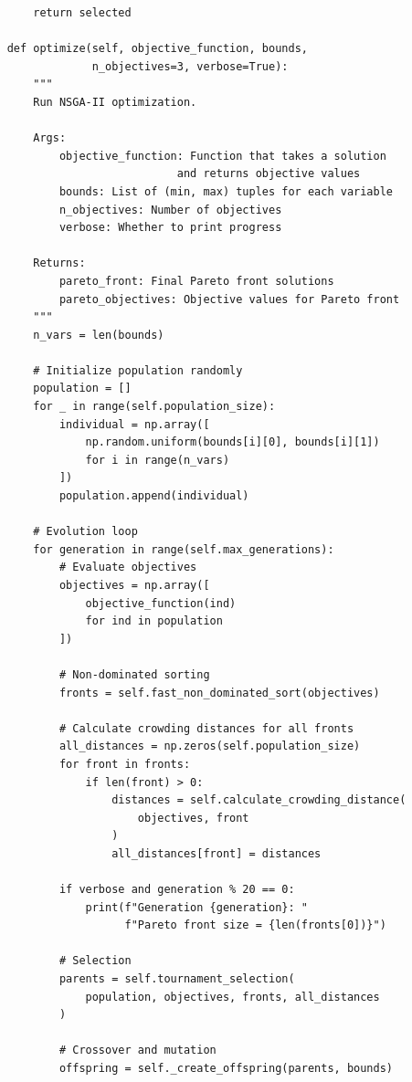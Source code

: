 \begin{lstlisting}
        return selected
    
    def optimize(self, objective_function, bounds, 
                 n_objectives=3, verbose=True):
        """
        Run NSGA-II optimization.
        
        Args:
            objective_function: Function that takes a solution
                              and returns objective values
            bounds: List of (min, max) tuples for each variable
            n_objectives: Number of objectives
            verbose: Whether to print progress
            
        Returns:
            pareto_front: Final Pareto front solutions
            pareto_objectives: Objective values for Pareto front
        """
        n_vars = len(bounds)
        
        # Initialize population randomly
        population = []
        for _ in range(self.population_size):
            individual = np.array([
                np.random.uniform(bounds[i][0], bounds[i][1])
                for i in range(n_vars)
            ])
            population.append(individual)
        
        # Evolution loop
        for generation in range(self.max_generations):
            # Evaluate objectives
            objectives = np.array([
                objective_function(ind) 
                for ind in population
            ])
            
            # Non-dominated sorting
            fronts = self.fast_non_dominated_sort(objectives)
            
            # Calculate crowding distances for all fronts
            all_distances = np.zeros(self.population_size)
            for front in fronts:
                if len(front) > 0:
                    distances = self.calculate_crowding_distance(
                        objectives, front
                    )
                    all_distances[front] = distances
            
            if verbose and generation % 20 == 0:
                print(f"Generation {generation}: "
                      f"Pareto front size = {len(fronts[0])}")
            
            # Selection
            parents = self.tournament_selection(
                population, objectives, fronts, all_distances
            )
            
            # Crossover and mutation
            offspring = self._create_offspring(parents, bounds)
            

\end{lstlisting}
